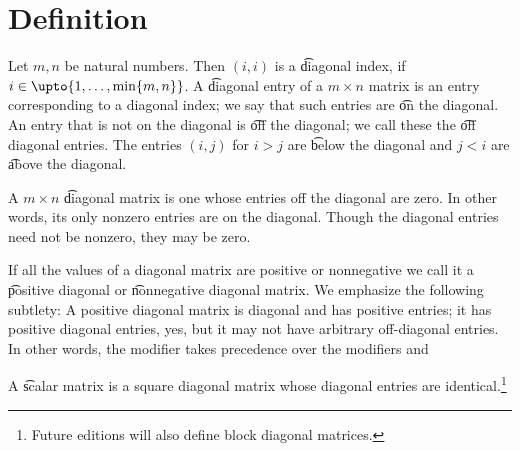 

\section*{Definition}

Let $m, n$ be natural numbers.
Then $(i, i)$ is a \t{diagonal index}, if $i \in \upto{1, \dots , \min\set{m, n}}$.
A \t{diagonal entry} of a $m \times n$ matrix is an entry corresponding to a diagonal index; we say that such entries are \t{on the diagonal}.
An entry that is not on the diagonal is \t{off the diagonal}; we call these the \t{off diagonal entries}.
The entries $(i, j)$ for $i > j$ are \t{below the diagonal} and $j < i$ are \t{above the diagonal}.

A $m \times n$ \t{diagonal} matrix is one whose entries off the diagonal are zero.
In other words, its only nonzero entries are on the diagonal.
Though the diagonal entries need not be nonzero, they may be zero.

If all the values of a diagonal matrix are positive or nonnegative we call it a \t{positive diagonal} or \t{nonnegative diagonal} matrix.
We emphasize the following subtlety: A positive diagonal matrix is diagonal and has positive entries; it has positive diagonal entries, yes, but it may not have arbitrary off-diagonal entries.
In other words, the modifier  takes precedence over the modifiers  and 

A \t{scalar matrix} is a square diagonal matrix whose diagonal entries are identical.\footnote{Future editions will also define block diagonal matrices.}

\blankpage
